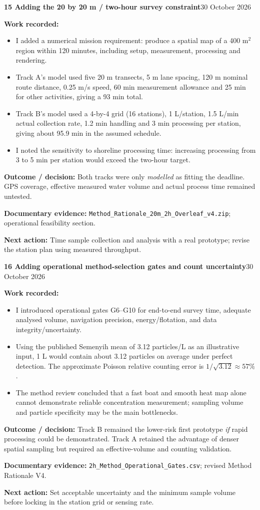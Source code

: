 \documentclass[11pt,a4paper]{article}
\newcommand{\logentry}[3]{%
  \Needspace{13\baselineskip}%
  \vspace{8pt}%
  {\large\bfseries\color{ink}#1 \quad #2}\hfill{\small\color{ink}#3}\par
  \vspace{-3pt}{\color{linecolor}\rule{\linewidth}{.6pt}}\par\vspace{1pt}%
}
\newcommand{\result}[1]{\textbf{Outcome / decision:} #1\par}
\newcommand{\evidence}[1]{\textbf{Documentary evidence:} {\small #1}\par}
\newcommand{\nextstep}[1]{\textbf{Next action:} #1\par}
\begin{document}
\logentry{15}{Adding the 20 by 20 m / two-hour survey constraint}{30 October 2026}
\textbf{Work recorded:}
\begin{itemize}
\item I added a numerical mission requirement: produce a spatial map of a 400 m$^2$ region within 120 minutes, including setup, measurement, processing and rendering.
\item Track A's model used five 20 m transects, 5 m lane spacing, 120 m nominal route distance, 0.25 m/s speed, 60 min measurement allowance and 25 min for other activities, giving a 93 min total.
\item Track B's model used a 4-by-4 grid (16 stations), 1 L/station, 1.5 L/min actual collection rate, 1.2 min handling and 3 min processing per station, giving about 95.9 min in the assumed schedule.
\item I noted the sensitivity to shoreline processing time: increasing processing from 3 to 5 min per station would exceed the two-hour target.
\end{itemize}
\result{Both tracks were only \emph{modelled} as fitting the deadline. GPS coverage, effective measured water volume and actual process time remained untested.}
\evidence{\texttt{Method\_Rationale\_20m\_2h\_Overleaf\_v4.zip}; operational feasibility section.}
\nextstep{Time sample collection and analysis with a real prototype; revise the station plan using measured throughput.}

\logentry{16}{Adding operational method-selection gates and count uncertainty}{30 October 2026}
\textbf{Work recorded:}
\begin{itemize}
\item I introduced operational gates G6--G10 for end-to-end survey time, adequate analysed volume, navigation precision, energy/flotation, and data integrity/uncertainty.
\item Using the published Semenyih mean of 3.12 particles/L as an illustrative input, 1 L would contain about 3.12 particles on average under perfect detection. The approximate Poisson relative counting error is $1/\sqrt{3.12}\approx57\%$.
\item The method review concluded that a fast boat and smooth heat map alone cannot demonstrate reliable concentration measurement; sampling volume and particle specificity may be the main bottlenecks.
\end{itemize}
\result{Track B remained the lower-risk first prototype \emph{if} rapid processing could be demonstrated. Track A retained the advantage of denser spatial sampling but required an effective-volume and counting validation.}
\evidence{\texttt{2h\_Method\_Operational\_Gates.csv}; revised Method Rationale V4.}
\nextstep{Set acceptable uncertainty and the minimum sample volume before locking in the station grid or sensing rate.}
\end{document}
